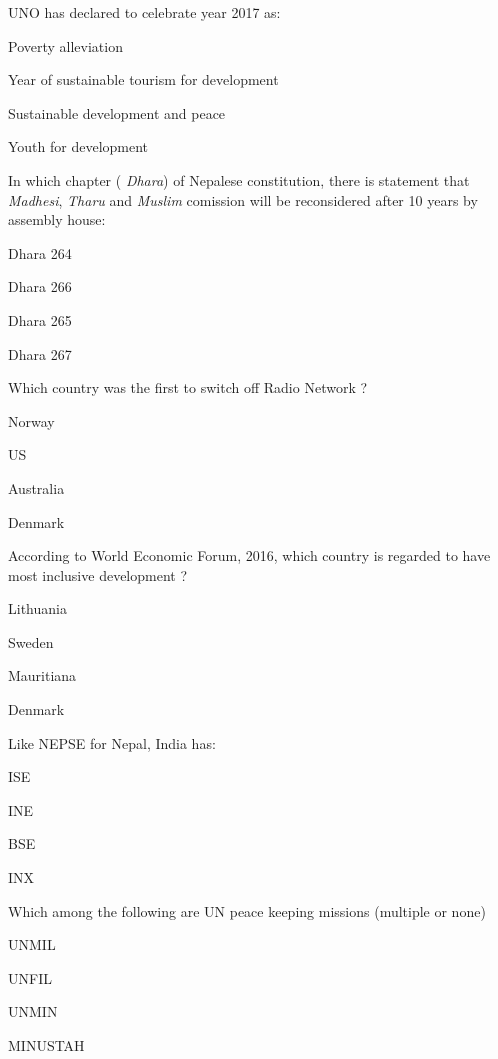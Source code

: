 \begin{questions}
\question UNO has declared to celebrate year 2017 as:
  \begin{items}
  \item Poverty alleviation
  \item Year of sustainable tourism for development
  \item Sustainable development and peace
  \item Youth for development
  \end{items}

\question In which chapter ( \textit{Dhara}) of Nepalese constitution, there is statement that \textit{Madhesi}, \textit{Tharu} and \textit{Muslim} comission will be reconsidered after 10 years by assembly house:
  \begin{items}
  \item Dhara 264
  \item Dhara 266
  \item Dhara 265
  \item Dhara 267
  \end{items}

\question Which country was the first to switch off Radio Network ?
  \begin{items}
  \item Norway
  \item US
  \item Australia
  \item Denmark
  \end{items}

\question According to World Economic Forum, 2016, which country is regarded to have most inclusive development ?
  \begin{items}
  \item Lithuania
  \item Sweden
  \item Mauritiana
  \item Denmark
  \end{items}

\question Like NEPSE for Nepal, India has:
  \begin{items}
  \item ISE
  \item INE
  \item BSE
  \item INX
  \end{items}

\question Which among the following are UN peace keeping missions (multiple or none)
  \begin{items}
  \item UNMIL
  \item UNFIL
  \item UNMIN
  \item MINUSTAH
  \end{items}


\end{questions}
